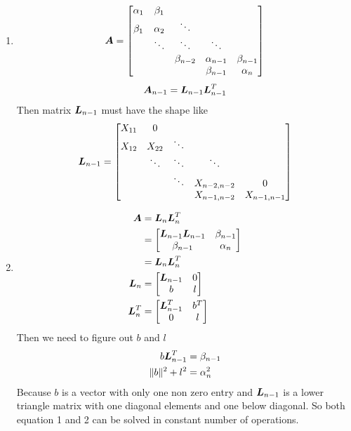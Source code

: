 \documentclass{article}
\begin{document}
\begin{enumerate}
\item 
\begin{displaymath}
\boldsymbol{A} = \begin{bmatrix} \alpha_1 & \beta_1 \\               \beta_1 & \alpha_2 & \ddots \\
                       & \ddots & \ddots & \ddots \\
                       &          & \beta_{n-2} & \alpha_{n-1} & \beta_{n-1} \\
                       &          &              & \beta_{n-1} & \alpha_n  \end{bmatrix}
\end{displaymath}
\begin{align*} 
\boldsymbol{A}_{n-1}=\boldsymbol{L}_{n-1}\boldsymbol{L}_{n-1}^T
\end{align*}
Then matrix $\boldsymbol{L}_{n-1}$ must have the shape like \\
\begin{displaymath}
\boldsymbol{L}_{n-1} = \begin{bmatrix} X_{11} & 0 \\               
			X_{12} & X_{22} & \ddots \\
                       & \ddots & \ddots & \ddots \\
                       &          & \ddots& X_{n-2,n-2} & 0\\
                       &          &              & X_{n-1,n-2}  & X_{n-1,n-1}  \end{bmatrix}
\end{displaymath}


\item 

\begin{align*} 
\boldsymbol{A} & = \boldsymbol{L}_n\boldsymbol{L}_n^T \\
& = \begin{bmatrix} \boldsymbol{L}_{n-1}\boldsymbol{L}_{n-1}  & \beta_{n-1} \\
		\beta_{n-1}  & \alpha_{n}  \end{bmatrix} \\
& = \boldsymbol{L}_n\boldsymbol{L}_n^T\\
\boldsymbol{L}_n &= \begin{bmatrix} \boldsymbol{L}_{n-1} & 0 \\ b & l  \end{bmatrix} \\
\boldsymbol{L}_n^T & =  \begin{bmatrix} \boldsymbol{L}_{n-1}^T & b^T \\ 0 & l  \end{bmatrix} \\
\end{align*} 
Then we need to figure out  $b$ and $l$ 
\begin{align} 
b\boldsymbol{L}_{n-1}^T &=\beta_{n-1}\\
\|b\|^2+l^2 &=\alpha_n^2
\end{align} 
Because $b$ is a vector with only one non zero entry and $\boldsymbol{L}_{n-1}$ is a lower triangle matrix with one diagonal elements and one below diagonal. So both equation 1 and 2 can be solved in constant number of operations. \\


\end{enumerate}
\end{document}
